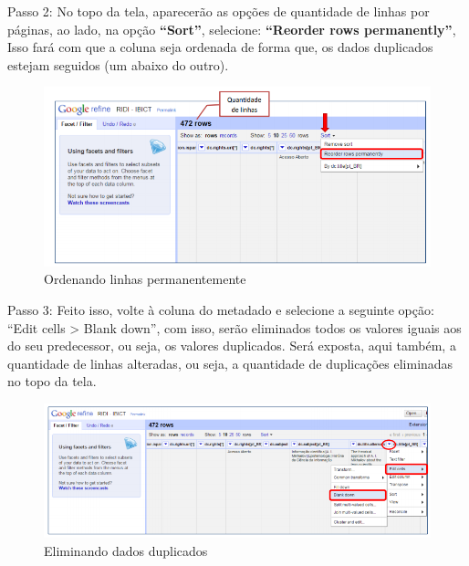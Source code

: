 \documentclass[12pt,hidelinks]{article}
\begin{document}
\newpage
    
    Passo 2: No topo da tela, aparecerão as opções de quantidade de linhas por páginas, ao lado, na opção \textbf{“Sort”}, selecione: \textbf{“Reorder rows permanently”}, Isso fará com que a coluna seja ordenada de forma que, os dados duplicados estejam seguidos (um abaixo do outro).
    
    \begin{figure}[!htp]
                \centering
                \includegraphics[scale=0.8]{figura/Figura205.png}
                \caption{Ordenando linhas permanentemente}
            \label{Rotulo}
        \end{figure}
    
    Passo 3: Feito isso, volte à coluna do metadado e selecione a seguinte opção: “Edit cells > Blank down”, com isso, serão eliminados todos os valores iguais aos do seu predecessor, ou seja, os valores duplicados. Será exposta, aqui também, a quantidade de linhas alteradas, ou seja, a quantidade de duplicações eliminadas no topo da tela.
    
    \begin{figure}[!htp]
                \centering
                \includegraphics[scale=0.8]{figura/Figura206.png}
                \caption{Eliminando dados duplicados}
            \label{Rotulo}
        \end{figure}
    
\newpage
    
\end{document}
